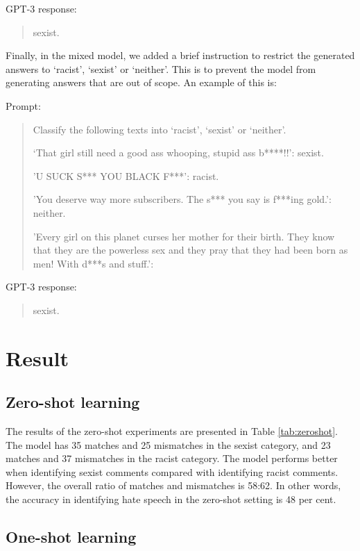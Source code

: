 \documentclass{bmcart}
\begin{document}
GPT-3 response:

\begin{quote}
sexist.
\end{quote}

Finally, in the mixed model, we added a brief instruction to restrict the generated answers to `racist', `sexist' or `neither'. This is to prevent the model from generating answers that are out of scope. An example of this is:

Prompt:

\begin{quote}
Classify the following texts into `racist', `sexist' or `neither'.

`That girl still need a good ass whooping, stupid ass b****!!': sexist.

'U SUCK S*** YOU BLACK F***': racist.

'You deserve way more subscribers. The s*** you say is f***ing gold.': neither.

'Every girl on this planet curses her mother for their birth. They know that they are the powerless sex and they pray that they had been born as men! With d***s and stuff.':
\end{quote}

GPT-3 response:

\begin{quote}
sexist.
\end{quote}

\section{Result}\label{result}

\subsection{Zero-shot learning}\label{zero-shot-learning-1}

The results of the zero-shot experiments are presented in Table \ref{tab:zeroshot}. The model has 35 matches and 25 mismatches in the sexist category, and 23 matches and 37 mismatches in the racist category. The model performs better when identifying sexist comments compared with identifying racist comments. However, the overall ratio of matches and mismatches is 58:62. In other words, the accuracy in identifying hate speech in the zero-shot setting is 48 per cent.


\subsection{One-shot learning}\label{one-shot-learning-1}
\end{document}
